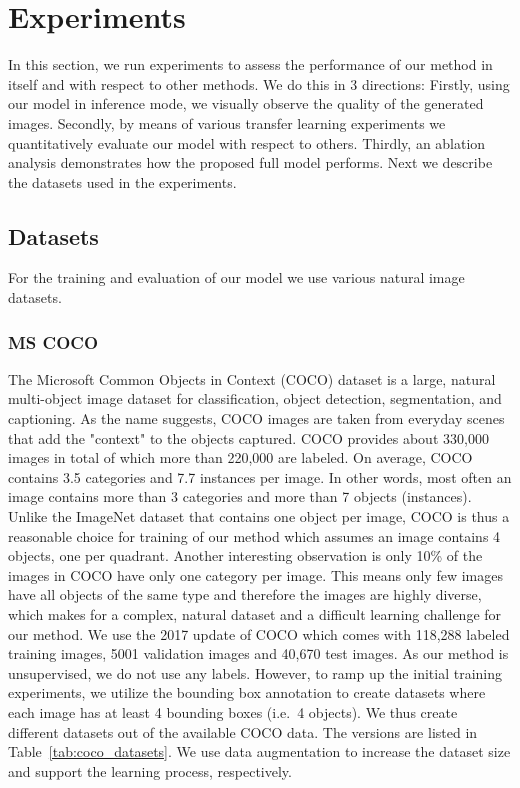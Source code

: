 \documentclass[a4paper,12pt]{report}
\begin{document}
\chapter{Experiments}\label{sec:experiments}
In this section, we run experiments to assess the performance of our method in itself and with respect to other methods. We do this in 3 directions: Firstly, using our model in inference mode, we visually observe the quality of the generated images. Secondly, by means of various transfer learning experiments we quantitatively evaluate our model with respect to others. Thirdly, an ablation analysis demonstrates how the proposed full model performs. Next we describe the datasets used in the experiments.

\section{Datasets}
For the training and evaluation of our model we use various natural image datasets.

\subsection{MS COCO}
The Microsoft Common Objects in Context (COCO) dataset \cite{MsCoco} is a large, natural multi-object image dataset for classification, object detection, segmentation, and captioning.
As the name suggests, COCO images are taken from everyday scenes that add the "context" to the objects captured. COCO provides about 330,000 images in total of which more than 220,000 are labeled. On average, COCO contains 3.5 categories and 7.7 instances per image. In other words, most often an image contains more than 3 categories and more than 7 objects (instances). Unlike the ImageNet dataset that contains one object per image, COCO is thus a reasonable choice for training of our method which assumes an image contains 4 objects, one per quadrant. Another interesting observation is only 10\% of the images in COCO have only one category per image. This means only few images have all objects of the same type and therefore the images are highly diverse, which makes for a complex, natural dataset and a difficult learning challenge for our method. We use the 2017 update of COCO which comes with 118,288 labeled training images, 5001 validation images and 40,670 test images. As our method is unsupervised, we do not use any labels. However, to ramp up the initial training experiments, we utilize the bounding box annotation to create datasets where each image has at least 4 bounding boxes (i.e.\ 4 objects). We thus create different datasets out of the available COCO data. The versions are listed in Table~\ref{tab:coco_datasets}. We use data augmentation to increase the dataset size and support the learning process, respectively.
\end{document}
